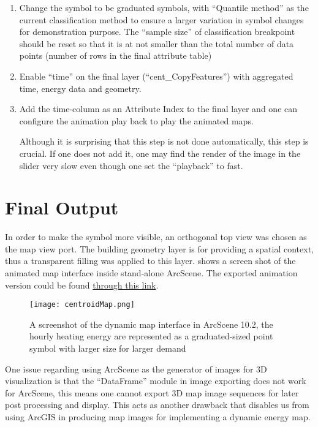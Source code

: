 \begin{enumerate}[1)]
\item Change the symbol to be graduated symbols, with ``Quantile
  method'' as the current classification method to ensure a larger
  variation in symbol changes for demonstration purpose. The ``sample
  size'' of classification breakpoint should be reset so that it is at
  not smaller than the total number of data points (number of rows in
  the final attribute table) 
  
\item Enable ``time'' on the final layer (``cent\_CopyFeatures'') with
  aggregated time, energy data and geometry.

\item Add the time-column as an Attribute Index to the final layer and
  one can configure the animation play back to play the animated
  maps. 

  Although it is surprising that this step is not done automatically,
  this step is crucial. If one does not add it, one may find the
  render of the image in the slider very slow even though one set the
  ``playback'' to fast.
\end{enumerate}

\section{Final Output}
In order to make the symbol more visible, an orthogonal top view was
chosen as the map view port. The building geometry layer is for
providing a spatial context, thus a transparent filling was applied to
this layer.  shows a screen shot of the animated
map interface inside stand-alone ArcScene. The exported animation
version could be found
\href{http://www.armechxyj.com/energy-mapping.html#slowAnime}{through
  this link}.

\begin{figure}[h!]
  \centering
  \texttt{[image: centroidMap.png]}
  \caption[Dynamic Map in ArcScene with Building Centroid]{A
    screenshot of the dynamic map interface in ArcScene 10.2, the
    hourly heating energy are represented as a graduated-sized point
    symbol with larger size for larger demand}
  \label{fig:centroidMap}
\end{figure}

One issue regarding using ArcScene as the generator of images for 3D
visualization is that the ``DataFrame'' module in image exporting does
not work for ArcScene, this means one cannot export 3D map image
sequences for later post processing and display. This acts as another
drawback that disables us from using ArcGIS in producing map images
for implementing a dynamic energy map.